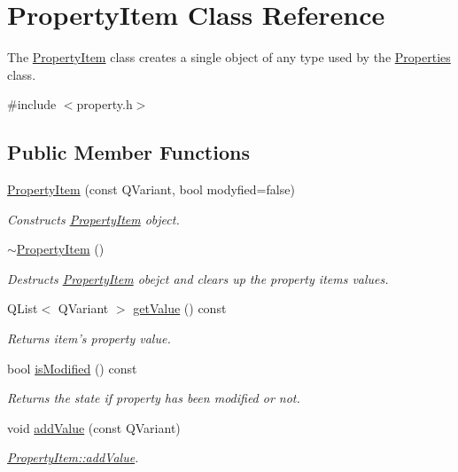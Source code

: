 \hypertarget{classPropertyItem}{\section{Property\-Item Class Reference}
\label{classPropertyItem}
}


The \hyperlink{classPropertyItem}{Property\-Item} class creates a single object of any type used by the \hyperlink{classProperties}{Properties} class.  




{\ttfamily \#include $<$property.\-h$>$}

\subsection*{Public Member Functions}
\begin{DoxyCompactItemize}
\item 
\hyperlink{classPropertyItem_aba8c67d9932b6cebec39d46853e9c5e0}{Property\-Item} (const Q\-Variant, bool modyfied=false)
\begin{DoxyCompactList}\small\item\em Constructs \hyperlink{classPropertyItem}{Property\-Item} object. \end{DoxyCompactList}\item 
\hyperlink{classPropertyItem_a0359155d78184d85b2e0360490b2ffe0}{$\sim$\-Property\-Item} ()
\begin{DoxyCompactList}\small\item\em Destructs \hyperlink{classPropertyItem}{Property\-Item} obejct and clears up the property items values. \end{DoxyCompactList}\item 
Q\-List$<$ Q\-Variant $>$ \hyperlink{classPropertyItem_a02d785cac9092258b7899f9a3a6f1bdd}{get\-Value} () const 
\begin{DoxyCompactList}\small\item\em Returns item's property value. \end{DoxyCompactList}\item 
bool \hyperlink{classPropertyItem_aac35d432deca70783d3e45ab26d06e33}{is\-Modified} () const 
\begin{DoxyCompactList}\small\item\em Returns the state if property has been modified or not. \end{DoxyCompactList}\item 
void \hyperlink{classPropertyItem_aaf7e9ff216f4136ed04be644f6755a82}{add\-Value} (const Q\-Variant)
\begin{DoxyCompactList}\small\item\em \hyperlink{classPropertyItem_aaf7e9ff216f4136ed04be644f6755a82}{Property\-Item\-::add\-Value}. \end{DoxyCompactList}\end{DoxyCompactItemize}
